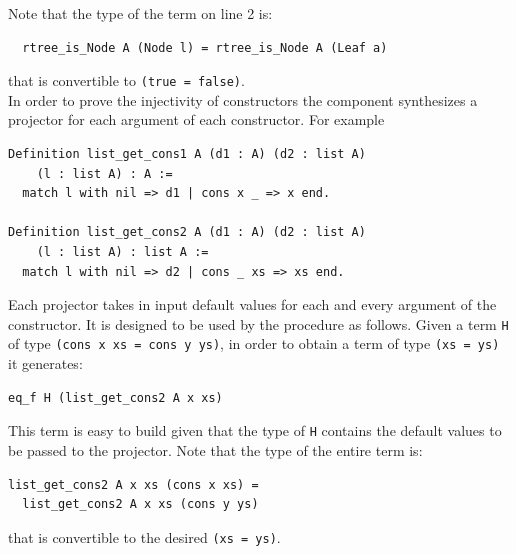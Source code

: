\documentclass[sigplan,10pt,review]{acmart}\settopmatter{printfolios=true,printccs=false,printacmref=false}
\newcommand{\derive}[1]{\keys{#1}}
\begin{document}
\noindent
Note that the type of the term on line 2 is:

\begin{minipage}{\textwidth}\begin{lstlisting}
  rtree_is_Node A (Node l) = rtree_is_Node A (Leaf a)
\end{lstlisting}\end{minipage}

\noindent
that is convertible to \lstinline+(true = false)+.
\\

In order to prove the injectivity of constructors the \derive{projK}
component synthesizes a projector for each argument of each constructor.
For example

\begin{minipage}{\textwidth}\begin{lstlisting}
Definition list_get_cons1 A (d1 : A) (d2 : list A)
    (l : list A) : A :=
  match l with nil => d1 | cons x _ => x end.

Definition list_get_cons2 A (d1 : A) (d2 : list A)
    (l : list A) : list A :=
  match l with nil => d2 | cons _ xs => xs end.
\end{lstlisting}\end{minipage}

\noindent
Each projector takes in input default values for each and every
argument of the constructor. It is designed to be used by the
\derive{injection} procedure as follows. Given a term
\lstinline+H+ of type \lstinline+(cons x xs = cons y ys)+, in order
to obtain a term of type \lstinline+(xs = ys)+ it generates:

\begin{minipage}{\textwidth}\begin{lstlisting}
eq_f H (list_get_cons2 A x xs)
\end{lstlisting}\end{minipage}

\noindent
This term is easy to build given that the type of \lstinline+H+
contains the default values to be passed to the projector.
Note that the type of the entire term is:

\begin{minipage}{\textwidth}\begin{lstlisting}
list_get_cons2 A x xs (cons x xs) =
  list_get_cons2 A x xs (cons y ys)
\end{lstlisting}\end{minipage}

\noindent
that is convertible to the desired \lstinline+(xs = ys)+.
\end{document}
